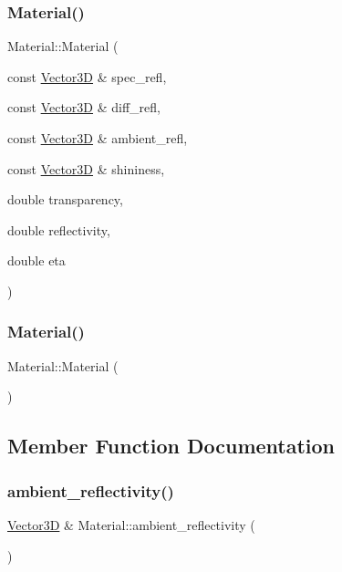 \subsubsection{\texorpdfstring{Material()}{Material()}\hspace{0.1cm}{\footnotesize\ttfamily [1/2]}}
{\footnotesize\ttfamily Material\+::\+Material (\begin{DoxyParamCaption}\item[{const \mbox{\hyperlink{classVector3D}{Vector3D}} \&}]{spec\+\_\+refl,  }\item[{const \mbox{\hyperlink{classVector3D}{Vector3D}} \&}]{diff\+\_\+refl,  }\item[{const \mbox{\hyperlink{classVector3D}{Vector3D}} \&}]{ambient\+\_\+refl,  }\item[{const \mbox{\hyperlink{classVector3D}{Vector3D}} \&}]{shininess,  }\item[{double}]{transparency,  }\item[{double}]{reflectivity,  }\item[{double}]{eta }\end{DoxyParamCaption})}

\mbox{\label{classMaterial_a6059ec72855855b11672ff25962e9336}} 
\subsubsection{\texorpdfstring{Material()}{Material()}\hspace{0.1cm}{\footnotesize\ttfamily [2/2]}}
{\footnotesize\ttfamily Material\+::\+Material (\begin{DoxyParamCaption}{ }\end{DoxyParamCaption})\hspace{0.3cm}{\ttfamily [default]}}



\subsection{Member Function Documentation}
\mbox{\label{classMaterial_a2b80ada55bf639ce99daa45f8c94bfc6}} 
\subsubsection{\texorpdfstring{ambient\_reflectivity()}{ambient\_reflectivity()}}
{\footnotesize\ttfamily \mbox{\hyperlink{classVector3D}{Vector3D}} \& Material\+::ambient\+\_\+reflectivity (\begin{DoxyParamCaption}{ }\end{DoxyParamCaption})}

